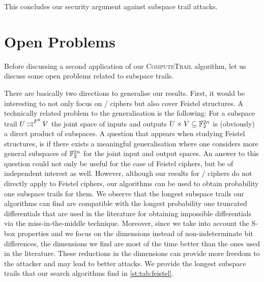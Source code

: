 This concludes our security argument against subspace trail attacks.

\section{Open Problems}\label{st:sec:conclusion}
Before discussing a second application of our \textsc{ComputeTrail} algorithm, let us discuss some open problems related to subspace trails.

There are basically two directions to generalise our results.
First, it would be interesting to not only focus on \SPN/ ciphers but also cover Feistel structures.
A technically related problem to the generalisation is the following: For a subspace trail $U \operatorname*{\rightrightarrows}^{F^k}_{} V$ the joint space of inputs and outputs $U \times V \subseteq \mathbb{F}_2^{2n}$ is (obviously) a direct product of subspaces.
A question that appears when studying Feistel structures, is if there exists a meaningful generalisation where one considers more general subspaces of $\mathbb{F}_2^{2n}$ for the joint input and output spaces.
An answer to this question could not only be useful for the case of Feistel ciphers, but be of independent interest as well.
However, although our results for \SPN/ ciphers do not directly apply to Feistel ciphers, our algorithms can be used to obtain probability one subspace trails for them.
We observe that the longest subspace trails our algorithms can find are compatible with the longest probability one truncated differentials that are used in the literature for obtaining impossible differentials via the miss-in-the-middle technique.
Moreover, since we take into account the S-box properties and we focus on the dimensions instead of non-indeterminate bit differences, the dimensions we find are most of the time better than the ones used in the literature.
These reductions in the dimensions can provide more freedom to the attacker and may lead to better attacks.
We provide the longest subspace trails that our search algorithms find in \cref{st:tab:feistel}.

